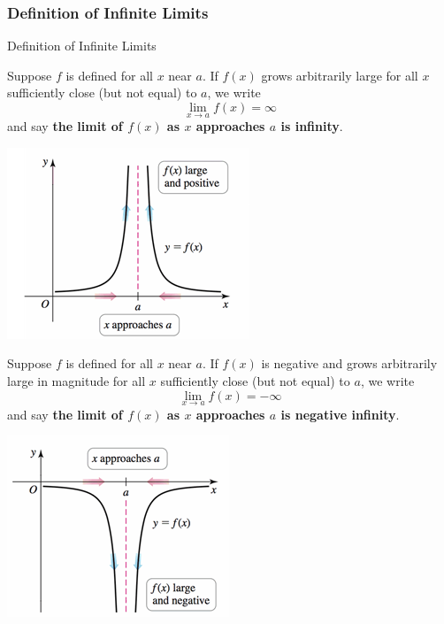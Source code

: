 \documentclass[cal1spr16Lectures.tex]{subfiles}
\begin{document}
\subsubsection{Definition of Infinite Limits}
\begin{frame}{\small Definition of Infinite Limits}
\begin{dfn} Suppose $f$ is defined for all $x$ near $a$.  If $f(x)$ grows arbitrarily large for all $x$ sufficiently close (but not equal) to $a$, we write
\[\lim_{x \to a} f(x) = \infty\]
and say {\bf the limit of $f(x)$ as $x$ approaches $a$ is infinity}. \end{dfn}
\end{frame}

\begin{frame}
\begin{center}
\noindent\includegraphics[scale=1]{pictures/Fig2_24a}
\end{center}
\end{frame}

\begin{frame}
\begin{dfn} Suppose $f$ is defined for all $x$ near $a$.  If $f(x)$ is negative and grows arbitrarily large in magnitude for all $x$ sufficiently close (but not equal) to $a$, we write
\[\lim_{x \to a} f(x) = -\infty\]
and say {\bf the limit of $f(x)$ as $x$ approaches $a$ is negative infinity}. \end{dfn}
\end{frame}

\begin{frame}
\begin{center}
\noindent\includegraphics[scale=1]{pictures/Fig2_24b} 
\end{center}
\end{frame}
\end{document}
